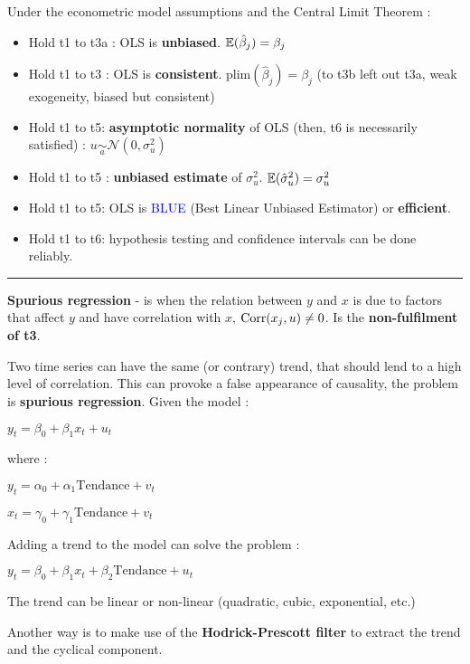 \begin{f}
	
Under the econometric model assumptions and the Central Limit Theorem :

\begin{itemize}[leftmargin=*]
	\item Hold t1 to t3a : OLS is \textbf{unbiased}. \(\mathbb{E}(\hat{\beta}_{j}) = \beta_{j}\)
	\item Hold t1 to t3 : OLS is \textbf{consistent}. \(\mathrm{plim}(\hat{\beta}_{j}) = \beta_{j}\) (to t3b left out t3a, weak exogeneity, biased but consistent)
	\item Hold t1 to t5: \textbf{asymptotic normality} of OLS (then, t6 is necessarily satisfied) : \(u \underset{a}{\sim}\mathcal{N}(0, \sigma^{2}_{u})\)
	\item Hold t1 to t5 : \textbf{unbiased estimate} of \(\sigma^{2}_{u}\). \(\mathbb{E}(\hat{\sigma}^{2}_{u}) = \sigma^{2}_{u}\)
	\item Hold t1 to t5: OLS is \textcolor{blue}{BLUE} (Best Linear Unbiased Estimator) or \textbf{efficient}.
	\item Hold t1 to t6: hypothesis testing and confidence intervals can be done reliably.
\end{itemize}


\end{f}  \hrule

\begin{f}

\textbf{Spurious regression} - is when the relation between \(y\) and \(x\) is due to factors that affect \(y\) and have correlation with \(x\), \(\mathrm{Corr}(x_{j}, u) \neq 0\). Is the \textbf {non-fulfilment of t3}.



Two time series can have the same (or contrary) trend, that should lend to a high level of correlation. This can provoke a false appearance of causality, the problem is \textbf{spurious regression}. Given the model :
%
\begin{center}
	\(y_{t} = \beta_{0} + \beta_{1} x_{t} + u_{t}\)
\end{center}
where :
\begin{center}
	\(y_{t} = \alpha_{0} + \alpha_{1} \mathrm{Tendance} + v_{t}\)
	
	\(x_{t} = \gamma_{0} + \gamma_{1} \mathrm{Tendance} + v_{t}\)
\end{center}
Adding a trend to the model can solve the problem :
\begin{center}
	\(y_{t} = \beta_{0} + \beta_{1} x_{t} + \beta_{2} \mathrm{Tendance} + u_{t}\)
\end{center}
The trend can be linear or non-linear (quadratic, cubic, exponential, etc.)

Another way is to make use of the \textbf{Hodrick-Prescott filter} to extract the trend and the cyclical component.

\end{f}    

